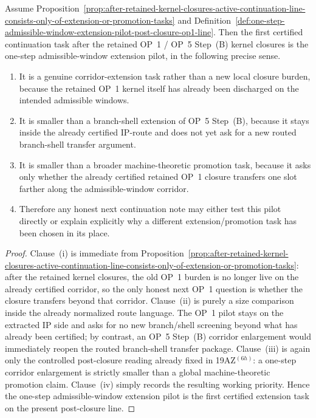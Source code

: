 \begin{proposition}
\label{prop:first-certified-extension-task-is-one-step-op1-admissible-window-pilot}
Assume Proposition~\ref{prop:after-retained-kernel-closures-active-continuation-line-consists-only-of-extension-or-promotion-tasks} and Definition~\ref{def:one-step-admissible-window-extension-pilot-post-closure-op1-line}. Then the first certified continuation task after the retained OP~1 / OP~5 Step~(B) kernel closures is the one-step admissible-window extension pilot, in the following precise sense.
\begin{enumerate}[leftmargin=2em,label=(\roman*)]
 \item It is a genuine corridor-extension task rather than a new local closure burden, because the retained OP~1 kernel itself has already been discharged on the intended admissible windows.
 \item It is smaller than a branch-shell extension of OP~5 Step~(B), because it stays inside the already certified IP-route and does not yet ask for a new routed branch-shell transfer argument.
 \item It is smaller than a broader machine-theoretic promotion task, because it asks only whether the already certified retained OP~1 closure transfers one slot farther along the admissible-window corridor.
 \item Therefore any honest next continuation note may either test this pilot directly or explain explicitly why a different extension/promotion task has been chosen in its place.
\end{enumerate}
\end{proposition}

\begin{proof}
Clause~(i) is immediate from Proposition~\ref{prop:after-retained-kernel-closures-active-continuation-line-consists-only-of-extension-or-promotion-tasks}: after the retained kernel closures, the old OP~1 burden is no longer live on the already certified corridor, so the only honest next OP~1 question is whether the closure transfers beyond that corridor. Clause~(ii) is purely a size comparison inside the already normalized route language. The OP~1 pilot stays on the extracted IP side and asks for no new branch/shell screening beyond what has already been certified; by contrast, an OP~5 Step~(B) corridor enlargement would immediately reopen the routed branch-shell transfer package. Clause~(iii) is again only the controlled post-closure reading already fixed in 19AZ$^{(6h)}$: a one-step corridor enlargement is strictly smaller than a global machine-theoretic promotion claim. Clause~(iv) simply records the resulting working priority. Hence the one-step admissible-window extension pilot is the first certified extension task on the present post-closure line.
\end{proof}

